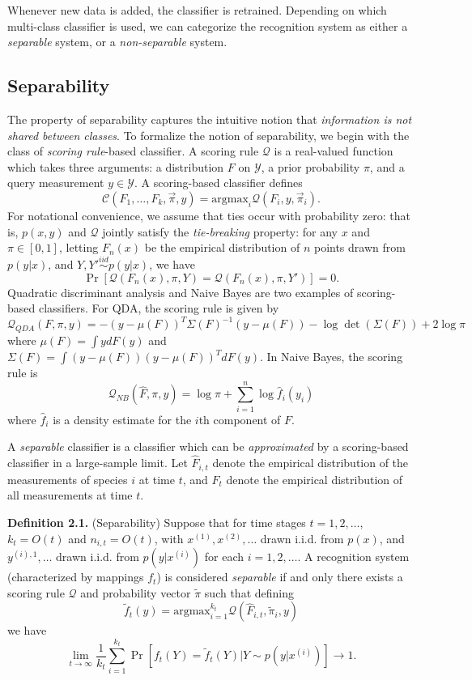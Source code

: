 \documentclass{article}
\newcommand{\argmax}{\text{argmax}}
\begin{document}
Whenever new data is added, the classifier is retrained.
Depending on which multi-class classifier is used, we can categorize the recognition system as either a
\emph{separable} system, or a \emph{non-separable} system.

\subsection{Separability}

The property of separability captures the intuitive notion that \emph{information is not shared between classes}.
To formalize the notion of separability, we begin with the class of \emph{scoring rule}-based classifier.
A scoring rule $\mathcal{Q}$ is a real-valued function which takes three arguments:
a distribution $F$ on $\mathcal{Y}$, a prior probability $\pi$, and a query measurement $y \in \mathcal{Y}$.
A scoring-based classifier defines
 \[
\mathcal{C}(F_1,\hdots, F_k, \vec{\pi}, y) = \argmax_i \mathcal{Q}(F_i, y, \vec{\pi}_i).
\]
For notational convenience, we assume that ties occur with probability zero: that is, $p(x, y)$ and $\mathcal{Q}$ jointly satisfy the \emph{tie-breaking} property:
for any $x$ and $\pi \in [0,1]$,
letting $F_n(x)$ be the empirical distribution of $n$ points drawn from $p(y|x)$, and $Y, Y' \stackrel{iid}{\sim} p(y|x)$,
we have
\begin{equation}\label{eq:tie}
\Pr[\mathcal{Q}(F_n(x), \pi, Y) = \mathcal{Q}(F_n(x), \pi, Y')] = 0.
\end{equation}
Quadratic discriminant analysis and Naive Bayes are two examples of scoring-based classifiers.
For QDA, the scoring rule is given by
\[
\mathcal{Q}_{QDA}(F, \pi, y) = -(y - \mu(F))^T \Sigma(F)^{-1} (y-\mu(F)) - \log\det(\Sigma(F)) + 2\log\pi
\]
where $\mu(F) = \int y dF(y)$ and $\Sigma(F) = \int (y-\mu(F))(y-\mu(F))^T dF(y)$.
In Naive Bayes, the scoring rule is
\[
\mathcal{Q}_{NB}(\hat{F}, \pi, y) = \log\pi + \sum_{i=1}^n \log \hat{f}_i(y_i)
\]
where $\hat{f}_i$ is a density estimate for the $i$th component of $F$.

A \emph{separable} classifier is a classifier which can be \emph{approximated} by a scoring-based classifier
in a large-sample limit. Let $\hat{F}_{i, t}$ denote the empirical distribution of the
measurements of species $i$ at time $t$, and $\hat{F}_t$ denote the empirical distribution of all measurements at time $t$.

\textbf{Definition 2.1.}  (Separability) Suppose that for time stages $t = 1,2,\hdots$, $k_t = O(t)$ and $n_{i,t} = O(t)$,
with $x^{(1)}, x^{(2)},\hdots$ drawn i.i.d. from $p(x)$, and $y^{(i),1},\hdots$ drawn i.i.d. from $p(y|x^{(i)})$ for each $i = 1,2,\hdots$.
A recognition system (characterized by mappings $f_t$) is considered \emph{separable} if and only there exists a scoring rule $\mathcal{Q}$ and probability vector $\tilde{\pi}$
such that defining
\[
\tilde{f}_t(y) = \argmax_{i=1}^{k_t} \mathcal{Q}(\hat{F}_{i, t}, \tilde{\pi}_i, y)
\]
we have
\[
\lim_{t \to \infty} \frac{1}{k_t} \sum_{i=1}^{k_t}\Pr[f_t(Y) = \tilde{f}_t(Y) | Y \sim p(y|x^{(i)})] \to 1.
\]
\end{document}
